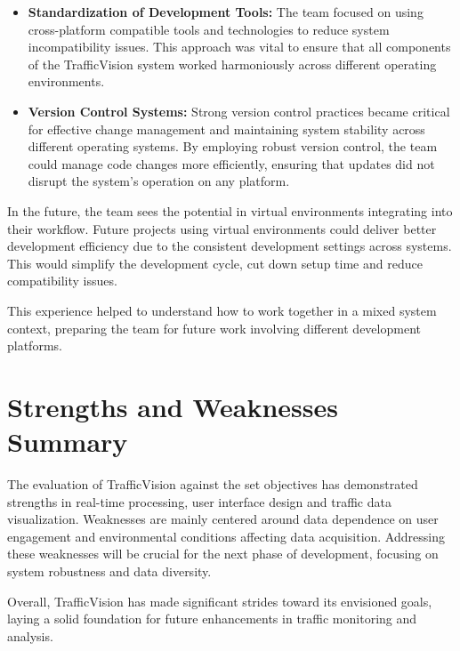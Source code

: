 \begin{itemize}
    \item \textbf{Standardization of Development Tools:} The team focused on using cross-platform compatible tools and technologies to reduce system incompatibility issues. This approach was vital to ensure that all components of the TrafficVision system worked harmoniously across different operating environments.
    \item \textbf{Version Control Systems:} Strong version control practices became critical for effective change management and maintaining system stability across different operating systems. By employing robust version control, the team could manage code changes more efficiently, ensuring that updates did not disrupt the system's operation on any platform.
\end{itemize}

In the future, the team sees the potential in virtual environments integrating into their workflow. Future projects using virtual environments could deliver better development efficiency due to the consistent development settings across systems. This would simplify the development cycle, cut down setup time and reduce compatibility issues.

This experience helped to understand how to work together in a mixed system context, preparing the team for future work involving different development platforms.

\section{Strengths and Weaknesses Summary}
The evaluation of TrafficVision against the set objectives has demonstrated strengths in real-time processing, user interface design and traffic data visualization. Weaknesses are mainly centered around data dependence on user engagement and environmental conditions affecting data acquisition. Addressing these weaknesses will be crucial for the next phase of development, focusing on system robustness and data diversity.

Overall, TrafficVision has made significant strides toward its envisioned goals, laying a solid foundation for future enhancements in traffic monitoring and analysis.